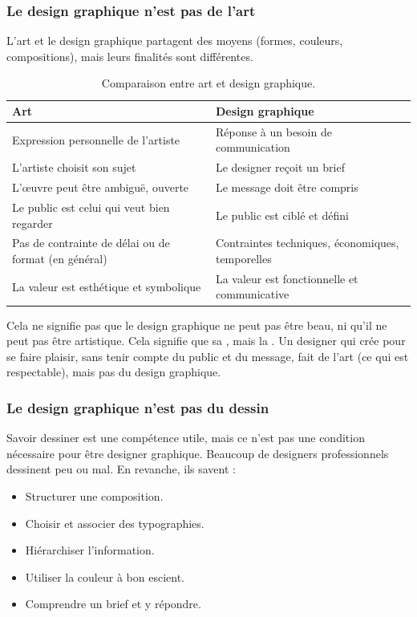\subsubsection{Le design graphique n'est pas de l'art}

L'art et le design graphique partagent des moyens (formes, couleurs, compositions), mais leurs finalités sont différentes.

\begin{table}[h!]
\centering
\begin{tabular}{@{}p{6cm}p{6cm}@{}}
\toprule
\textbf{Art} & \textbf{Design graphique} \\
\midrule
Expression personnelle de l'artiste & Réponse à un besoin de communication \\
L'artiste choisit son sujet & Le designer reçoit un brief \\
L'œuvre peut être ambiguë, ouverte & Le message doit être compris \\
Le public est celui qui veut bien regarder & Le public est ciblé et défini \\
Pas de contrainte de délai ou de format (en général) & Contraintes techniques, économiques, temporelles \\
La valeur est esthétique et symbolique & La valeur est fonctionnelle et communicative \\
\bottomrule
\end{tabular}
\caption{Comparaison entre art et design graphique.}
\end{table}

Cela ne signifie pas que le design graphique ne peut pas être beau, ni qu'il ne peut pas être artistique. Cela signifie que sa , mais la . Un designer qui crée pour se faire plaisir, sans tenir compte du public et du message, fait de l'art (ce qui est respectable), mais pas du design graphique.

\subsubsection{Le design graphique n'est pas du dessin}

Savoir dessiner est une compétence utile, mais ce n'est pas une condition nécessaire pour être designer graphique. Beaucoup de designers professionnels dessinent peu ou mal. En revanche, ils savent :

\begin{itemize}
    \item Structurer une composition.
    \item Choisir et associer des typographies.
    \item Hiérarchiser l'information.
    \item Utiliser la couleur à bon escient.
    \item Comprendre un brief et y répondre.
\end{itemize}

